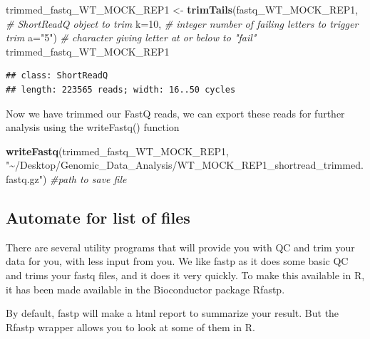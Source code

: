 \documentclass[
]{book}
\newenvironment{Shaded}{\begin{snugshade}}{\end{snugshade}}
\newcommand{\AttributeTok}[1]{\textcolor[rgb]{0.13,0.29,0.53}{#1}}
\newcommand{\CommentTok}[1]{\textcolor[rgb]{0.56,0.35,0.01}{\textit{#1}}}
\newcommand{\DecValTok}[1]{\textcolor[rgb]{0.00,0.00,0.81}{#1}}
\newcommand{\FunctionTok}[1]{\textcolor[rgb]{0.13,0.29,0.53}{\textbf{#1}}}
\newcommand{\NormalTok}[1]{#1}
\newcommand{\OtherTok}[1]{\textcolor[rgb]{0.56,0.35,0.01}{#1}}
\newcommand{\StringTok}[1]{\textcolor[rgb]{0.31,0.60,0.02}{#1}}
\begin{document}
\begin{Shaded}
\begin{Highlighting}[]
\NormalTok{trimmed\_fastq\_WT\_MOCK\_REP1 }\OtherTok{\textless{}{-}} \FunctionTok{trimTails}\NormalTok{(fastq\_WT\_MOCK\_REP1, }\CommentTok{\# ShortReadQ object to trim}
                          \AttributeTok{k=}\DecValTok{10}\NormalTok{, }\CommentTok{\# integer number of failing letters to trigger trim}
                          \AttributeTok{a=}\StringTok{"5"}\NormalTok{) }\CommentTok{\# character giving letter at or below to "fail"}
\NormalTok{trimmed\_fastq\_WT\_MOCK\_REP1}
\end{Highlighting}
\end{Shaded}

\begin{verbatim}
## class: ShortReadQ
## length: 223565 reads; width: 16..50 cycles
\end{verbatim}

Now we have trimmed our FastQ reads, we can export these reads for further analysis using the writeFastq() function

\begin{Shaded}
\begin{Highlighting}[]
\FunctionTok{writeFastq}\NormalTok{(trimmed\_fastq\_WT\_MOCK\_REP1,}
           \StringTok{"\textasciitilde{}/Desktop/Genomic\_Data\_Analysis/WT\_MOCK\_REP1\_shortread\_trimmed.fastq.gz"}\NormalTok{) }\CommentTok{\#path to save file}
\end{Highlighting}
\end{Shaded}

\hypertarget{automate-for-list-of-files}{%
\subsection{Automate for list of files}\label{automate-for-list-of-files}}

There are several utility programs that will provide you with QC and trim your data for you, with less input from you. We like fastp as it does some basic QC and trims your fastq files, and it does it very quickly. To make this available in R, it has been made available in the Bioconductor package Rfastp.

By default, fastp will make a html report to summarize your result. But the Rfastp wrapper allows you to look at some of them in R.
\end{document}
